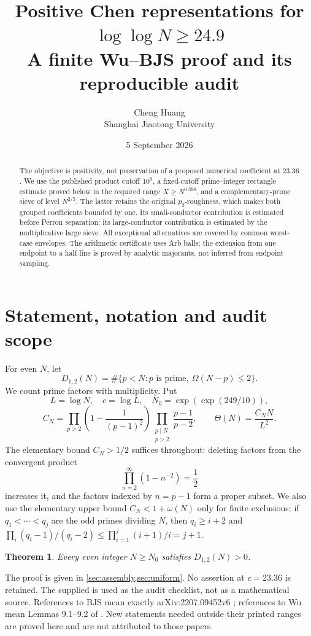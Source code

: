 \documentclass[11pt]{article}
\title{Positive Chen representations for $\log\log N\ge24.9$\\
\large A finite Wu--BJS proof and its reproducible audit}
\author{Cheng Huang\\
\small Shanghai Jiaotong University}
\date{5 September 2026}
\newtheorem{theorem}{Theorem}[section]
\theoremstyle{definition}
\newcommand{\Th}{\Theta(N)}
\newcommand{\cert}[1]{\texttt{\detokenize{#1}}}
\begin{document}
\maketitle
\begin{abstract}
The objective is positivity, not preservation of a proposed numerical
coefficient at $23.36$.  We use the published product cutoff $10^9$, a
fixed-cutoff prime--integer rectangle estimate proved below in the required
range $X\ge N^{0.398}$, and a complementary-prime sieve of level $N^{2/5}$.
The latter retains the original $p_2$-roughness, which makes both grouped
coefficients bounded by one.  Its small-conductor contribution is estimated
before Perron separation; its large-conductor contribution is estimated by
the multiplicative large sieve.  All exceptional alternatives are covered
by common worst-case envelopes.  The arithmetic certificate uses Arb balls;
the extension from one endpoint to a half-line is proved by analytic
majorants, not inferred from endpoint sampling.
\end{abstract}
\tableofcontents

\section{Statement, notation and audit scope}

For even $N$, let
\[
 D_{1,2}(N)=\#\{p<N:p\text{ is prime},\ \Omega(N-p)\le2\}.
\]
We count prime factors with multiplicity.  Put
\[
 L=\log N,\quad c=\log L,\quad N_0=\exp(\exp(249/10)),
\]
\[
 C_N=\prod_{p>2}\left(1-\frac1{(p-1)^2}\right)
       \prod_{\substack{p\mid N\\p>2}}\frac{p-1}{p-2},
 \qquad \Th=\frac{C_NN}{L^2}.
\]
The elementary bound $C_N>1/2$ suffices throughout: deleting factors from
the convergent product
\[
 \prod_{n=2}^{\infty}(1-n^{-2})=\frac12
\]
increases it, and the factors indexed by $n=p-1$ form a proper subset.
We also use the elementary upper bound $C_N<1+\omega(N)$ only for
finite exclusions: if $q_1<\cdots<q_j$ are the odd primes dividing
$N$, then $q_i\ge i+2$ and
$\prod_i(q_i-1)/(q_i-2)\le\prod_{i=1}^j(i+1)/i=j+1$.

\begin{theorem}\label{thm:main}
Every even integer $N\ge N_0$ satisfies $D_{1,2}(N)>0$.
\end{theorem}

The proof is given in \cref{sec:assembly,sec:uniform}.  No assertion at
$c=23.36$ is retained.  The supplied \cert{reply.md} is used as the audit
checklist, not as a mathematical source.  References to BJS mean exactly
arXiv:2207.09452v6 \cite{BJS}; references to Wu mean Lemmas 9.1--9.2 of
\cite{Wu}.  New statements needed outside their printed ranges are proved
here and are not attributed to those papers.
\end{document}

